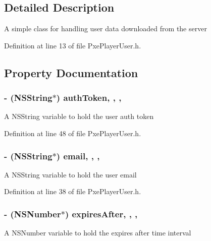 \subsection{Detailed Description}
A simple class for handling user data downloaded from the server 

Definition at line 13 of file Pxe\-Player\-User.\-h.



\subsection{Property Documentation}
\hypertarget{interface_pxe_player_user_a3e471652db745d470f639bd926e49ee7}{
\subsubsection[{auth\-Token}]{\setlength{\rightskip}{0pt plus 5cm}-\/ (N\-S\-String$\ast$) auth\-Token\hspace{0.3cm}{\ttfamily [read]}, {\ttfamily [write]}, {\ttfamily [nonatomic]}, {\ttfamily [strong]}}}\label{interface_pxe_player_user_a3e471652db745d470f639bd926e49ee7}
A N\-S\-String variable to hold the user auth token 

Definition at line 48 of file Pxe\-Player\-User.\-h.

\hypertarget{interface_pxe_player_user_a1a39f13f885fbf6dfea1ccc0856ca13a}{
\subsubsection[{email}]{\setlength{\rightskip}{0pt plus 5cm}-\/ (N\-S\-String$\ast$) email\hspace{0.3cm}{\ttfamily [read]}, {\ttfamily [write]}, {\ttfamily [nonatomic]}, {\ttfamily [strong]}}}\label{interface_pxe_player_user_a1a39f13f885fbf6dfea1ccc0856ca13a}
A N\-S\-String variable to hold the user email 

Definition at line 38 of file Pxe\-Player\-User.\-h.

\hypertarget{interface_pxe_player_user_af6e60b5781ab406dbbff7ccb8a91803d}{
\subsubsection[{expires\-After}]{\setlength{\rightskip}{0pt plus 5cm}-\/ (N\-S\-Number$\ast$) expires\-After\hspace{0.3cm}{\ttfamily [read]}, {\ttfamily [write]}, {\ttfamily [nonatomic]}, {\ttfamily [strong]}}}\label{interface_pxe_player_user_af6e60b5781ab406dbbff7ccb8a91803d}
A N\-S\-Number variable to hold the expires after time interval 

